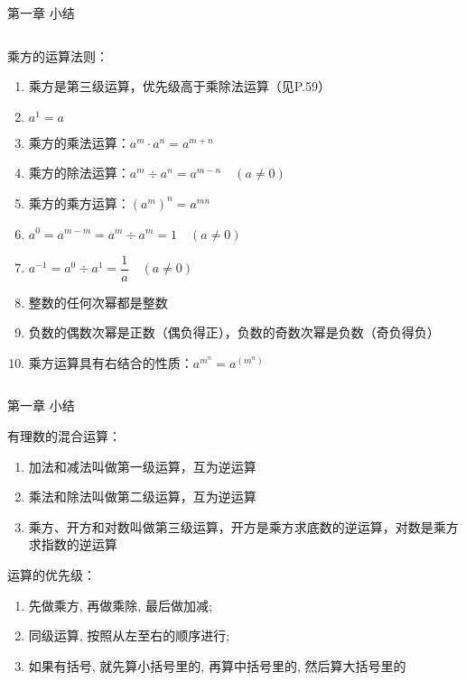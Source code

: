 \documentclass[aspectratio=169]{ctexbeamer} %
\begin{document}
\begin{frame}[t]{第一章 小结}
\begin{columns}
\begin{spacing}{1.2}
\normalsize
乘方的运算法则：
\begin{enumerate}[label={\arabic*.}]
\item 乘方是第三级运算，优先级高于乘除法运算（见P.59）
\item $a^1 = a$
\item 乘方的乘法运算：$ a^m \cdot a^n = a ^{m+n}$
\item 乘方的除法运算：$ a^m ÷ a^n = a ^{m-n} \quad (a \ne 0)$
\item 乘方的乘方运算：$(a^m)^n = a^{mn}$
\item $ a^0 = a^{m-m} = a^m ÷ a^m = 1 \quad (a \ne 0)$
\item $ a^{-1} = a^0 ÷ a^1 = \dfrac{1}{a} \quad (a \ne 0)$
\item 整数的任何次幂都是整数
\item 负数的偶数次幂是正数（偶负得正），负数的奇数次幂是负数（奇负得负）
\item 乘方运算具有右结合的性质：$a^{m^n} = a^{(m^n)}$ 
\end{enumerate}
\end{spacing}
\end{columns}
\end{frame}

\begin{frame}[t]{第一章 小结}
\begin{spacing}{1.2}
\normalsize
\alert{有理数的混合运算：}
\begin{enumerate}[label={\arabic*.}]
\item 加法和减法叫做第一级运算，互为逆运算
\item 乘法和除法叫做第二级运算，互为逆运算
\item 乘方、开方和对数叫做第三级运算，开方是乘方求底数的逆运算，对数是乘方求指数的逆运算
\end{enumerate}

\alert{运算的优先级：}
\begin{enumerate}[label={\arabic*.}]
\item 先做乘方, 再做乘除, 最后做加减;
\item 同级运算, 按照从左至右的顺序进行;
\item 如果有括号, 就先算小括号里的, 再算中括号里的, 然后算大括号里的
\end{enumerate}
\end{spacing}
\end{frame}
\end{document}

